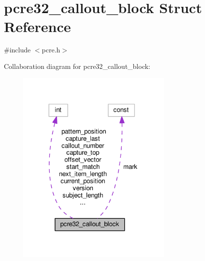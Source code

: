 \hypertarget{structpcre32__callout__block}{}\section{pcre32\+\_\+callout\+\_\+block Struct Reference}
\label{structpcre32__callout__block}


{\ttfamily \#include $<$pcre.\+h$>$}



Collaboration diagram for pcre32\+\_\+callout\+\_\+block\+:
\nopagebreak
\begin{figure}[H]
\begin{center}
\leavevmode
\includegraphics[width=218pt]{structpcre32__callout__block__coll__graph}
\end{center}
\end{figure}
